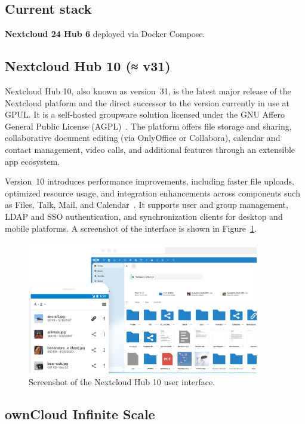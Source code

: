 \subsection*{Current stack}
\textbf{Nextcloud 24 Hub 6} deployed via Docker Compose.

\subsection*{Nextcloud Hub 10 (≈ v31)}

Nextcloud Hub 10, also known as version~31, is the latest major release of the Nextcloud platform and the direct successor to the version currently in use at GPUL. It is a self-hosted groupware solution licensed under the GNU Affero General Public License (AGPL)~\cite{nextcloud-docs}. The platform offers file storage and sharing, collaborative document editing (via OnlyOffice or Collabora), calendar and contact management, video calls, and additional features through an extensible app ecosystem.

Version~10 introduces performance improvements, including faster file uploads, optimized resource usage, and integration enhancements across components such as Files, Talk, Mail, and Calendar~\cite{nextcloud-blog}. It supports user and group management, LDAP and SSO authentication, and synchronization clients for desktop and mobile platforms. A screenshot of the interface is shown in Figure~\ref{fig:nextcloud-ui}.

\begin{figure}[h!]
  \centering
  \includegraphics[width=0.9\textwidth]{imaxes/nextcloud-ui.png}
  \caption{Screenshot of the Nextcloud Hub 10 user interface.}
  \label{fig:nextcloud-ui}
\end{figure}

\subsection*{ownCloud Infinite Scale}

